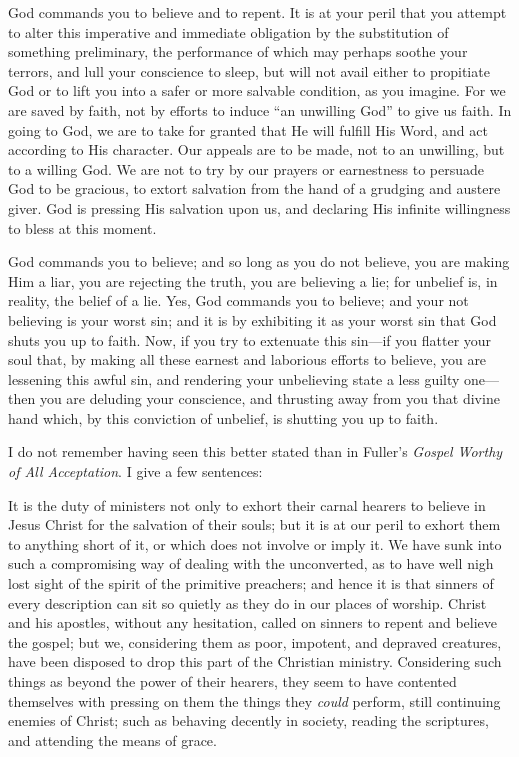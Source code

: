 \documentclass[
]{book}
\begin{document}
God commands you to believe and to repent. It is at your peril that you attempt to alter this imperative and immediate obligation by the substitution of something preliminary, the performance of which may perhaps soothe your terrors, and lull your conscience to sleep, but will not avail either to propitiate God or to lift you into a safer or more salvable condition, as you imagine. For we are saved by faith, not by efforts to induce ``an unwilling God'' to give us faith. In going to God, we are to take for granted that He will fulfill His Word, and act according to His character. Our appeals are to be made, not to an unwilling, but to a willing God. We are not to try by our prayers or earnestness to persuade God to be gracious, to extort salvation from the hand of a grudging and austere giver. God is pressing His salvation upon us, and declaring His infinite willingness to bless at this moment.

God commands you to believe; and so long as you do not believe, you are making Him a liar, you are rejecting the truth, you are believing a lie; for unbelief is, in reality, the belief of a lie. Yes, God commands you to believe; and your not believing is your worst sin; and it is by exhibiting it as your worst sin that God shuts you up to faith. Now, if you try to extenuate this sin---if you flatter your soul that, by making all these earnest and laborious efforts to believe, you are lessening this awful sin, and rendering your unbelieving state a less guilty one---then you are deluding your conscience, and thrusting away from you that divine hand which, by this conviction of unbelief, is shutting you up to faith.

I do not remember having seen this better stated than in Fuller's \emph{Gospel Worthy of All Acceptation}. I give a few sentences:

It is the duty of ministers not only to exhort their carnal hearers to believe in Jesus Christ for the salvation of their souls; but it is at our peril to exhort them to anything short of it, or which does not involve or imply it. We have sunk into such a compromising way of dealing with the unconverted, as to have well nigh lost sight of the spirit of the primitive preachers; and hence it is that sinners of every description can sit so quietly as they do in our places of worship. Christ and his apostles, without any hesitation, called on sinners to repent and believe the gospel; but we, considering them as poor, impotent, and depraved creatures, have been disposed to drop this part of the Christian ministry. Considering such things as beyond the power of their hearers, they seem to have contented themselves with pressing on them the things they \emph{could} perform, still continuing enemies of Christ; such as behaving decently in society, reading the scriptures, and attending the means of grace.
\end{document}
